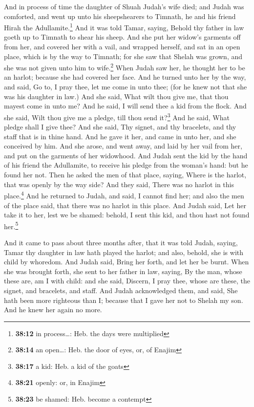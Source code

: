  And in process of time the daughter of Shuah Judah's
wife died; and Judah was comforted, and went up unto his sheepshearers
to Timnath, he and his friend Hirah the Adullamite.\footnote{\textbf{38:12}
  in process\ldots: Heb. the days were multiplied}  And
it was told Tamar, saying, Behold thy father in law goeth up to Timnath
to shear his sheep.  And she put her widow's garments off
from her, and covered her with a vail, and wrapped herself, and sat in
an open place, which is by the way to Timnath; for she saw that Shelah
was grown, and she was not given unto him to wife.\footnote{\textbf{38:14}
  an open\ldots: Heb. the door of eyes, or, of Enajim} 
When Judah saw her, he thought her to be an harlot; because she had
covered her face.  And he turned unto her by the way, and
said, Go to, I pray thee, let me come in unto thee; (for he knew not
that she was his daughter in law.) And she said, What wilt thou give me,
that thou mayest come in unto me?  And he said, I will
send thee a kid from the flock. And she said, Wilt thou give me a
pledge, till thou send it?\footnote{\textbf{38:17} a kid: Heb. a kid of
  the goats}  And he said, What pledge shall I give thee?
And she said, Thy signet, and thy bracelets, and thy staff that is in
thine hand. And he gave it her, and came in unto her, and she conceived
by him.  And she arose, and went away, and laid by her
vail from her, and put on the garments of her widowhood. 
And Judah sent the kid by the hand of his friend the Adullamite, to
receive his pledge from the woman's hand: but he found her not.
 Then he asked the men of that place, saying, Where is
the harlot, that was openly by the way side? And they said, There was no
harlot in this place.\footnote{\textbf{38:21} openly: or, in Enajim}
 And he returned to Judah, and said, I cannot find her;
and also the men of the place said, that there was no harlot in this
place.  And Judah said, Let her take it to her, lest we
be shamed: behold, I sent this kid, and thou hast not found
her.\footnote{\textbf{38:23} be shamed: Heb. become a contempt}

 And it came to pass about three months after, that it
was told Judah, saying, Tamar thy daughter in law hath played the
harlot; and also, behold, she is with child by whoredom. And Judah said,
Bring her forth, and let her be burnt.  When she was
brought forth, she sent to her father in law, saying, By the man, whose
these are, am I with child: and she said, Discern, I pray thee, whose
are these, the signet, and bracelets, and staff.  And
Judah acknowledged them, and said, She hath been more righteous than I;
because that I gave her not to Shelah my son. And he knew her again no
more.


